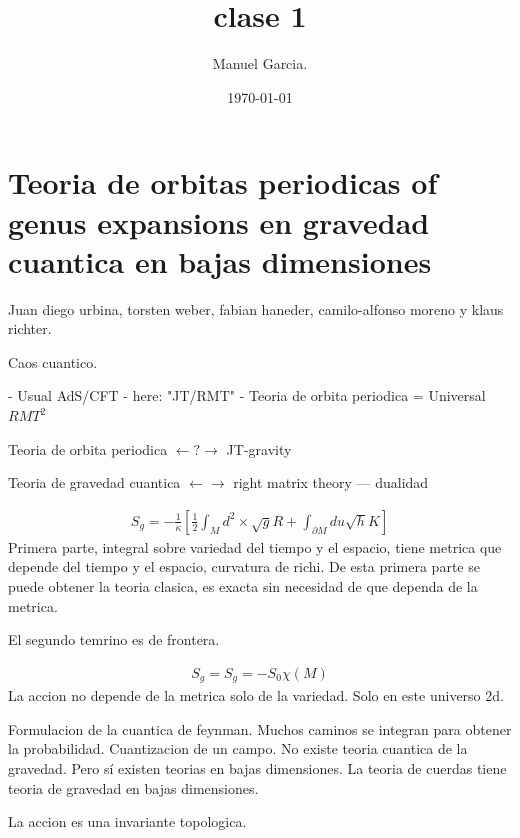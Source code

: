 \documentclass{article}
\title{clase 1}
\author{Manuel Garcia.}
\date{\today}
\newcommand{\caja}[2]{%
  \begin{tcolorbox}[colback=blue!5!white,colframe=blue!25!black,title=#1]
    #2
  \end{tcolorbox}%
}
\begin{document}
\maketitle

\section{Teoria de orbitas periodicas of genus expansions en gravedad cuantica en bajas dimensiones}
Juan diego urbina, torsten weber, fabian haneder, camilo-alfonso moreno y klaus richter. 

Caos cuantico. 

- Usual AdS/CFT
- here: "JT/RMT"
- Teoria de orbita periodica = Universal $RMT^2$

\caja{Objetivo}{
  Teoria de orbita periodica $\leftarrow?\rightarrow$ JT-gravity
}
Teoria de gravedad cuantica $\leftarrow\rightarrow$ right matrix theory  --- dualidad
\caja{Accion de la gravedad euclideana en 2d }{
  \begin{gather}
    S _{g } =-\frac{1}{\kappa}[\frac{1}{2}\int_{M }^{}d^2 \times \sqrt{g} R + \int_{\partial M }^{}du \sqrt{h} K]
    \label{eq:2dactioneuclid}
  \end{gather}
  Primera parte, integral sobre variedad del tiempo y el espacio, tiene metrica que depende del tiempo y el espacio, curvatura de richi. De esta primera parte se puede obtener la teoria clasica, es exacta sin necesidad de que dependa de la metrica. 

  El segundo temrino es de frontera. 
}
\caja{Gauss- bonnet}{
  \begin{gather}
    S _{g } =S_g=-S_0 \chi(M) 
    \label{eq:gaussbonnet}
  \end{gather}
  La accion no depende de la metrica solo de la variedad. Solo en este universo 2d.
}
Formulacion de la cuantica de feynman. Muchos caminos se integran para obtener la probabilidad. Cuantizacion de un campo. No existe teoria cuantica de la gravedad. Pero sí existen teorias en bajas dimensiones. La teoria de cuerdas tiene teoria de gravedad en bajas dimensiones.

La accion es una invariante topologica. 
\end{document}
